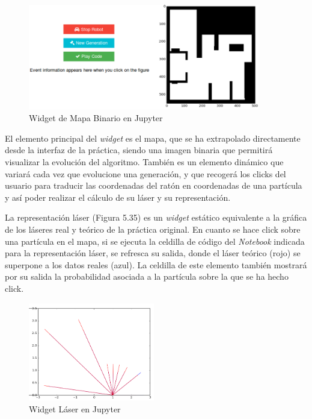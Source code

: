 \begin{figure}[H]
	\begin{center}
		\includegraphics[width=0.90\textwidth]{figures/mapabinariojupyter.png}
		\caption{Widget de Mapa Binario en Jupyter}
		\label{fig.mapabinariojupyter}
	\end{center}
\end{figure}

El elemento principal del \textit{widget} es el mapa, que se ha extrapolado directamente desde la interfaz de la práctica, siendo una imagen binaria que permitirá visualizar la evolución del algoritmo. También es un elemento dinámico que variará cada vez que evolucione una generación, y que recogerá los clicks del usuario para traducir las coordenadas del ratón en coordenadas de una partícula y así poder realizar el cálculo de su láser y su representación.

La representación láser (Figura 5.35) es un \textit{widget} estático equivalente a la gráfica de los láseres real y teórico de la práctica original. En cuanto se hace click sobre una partícula en el mapa, si se ejecuta la celdilla de código del \textit{Notebook} indicada para la representación láser, se refresca su salida, donde el láser teórico (rojo) se superpone a los datos reales (azul). La celdilla de este elemento también mostrará por su salida la probabilidad asociada a la partícula sobre la que se ha hecho click.

\begin{figure}[H]
	\begin{center}
		\includegraphics[width=0.49\textwidth]{figures/laserjupyter.png}
		\caption{Widget Láser en Jupyter}
		\label{fig.laserjupyter}
	\end{center}
\end{figure}

